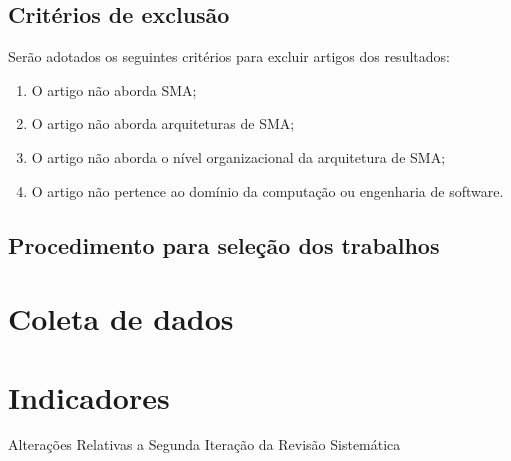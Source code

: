 \subsection{Critérios de exclusão}

Serão adotados os seguintes critérios para excluir artigos dos resultados:

\begin{enumerate}
    \item O artigo não aborda SMA;
    \item O artigo não aborda arquiteturas de SMA;
    \item O artigo não aborda o nível organizacional da arquitetura de SMA;
    \item O artigo não pertence ao domínio da computação ou engenharia de software.
\end{enumerate}

\subsection{Procedimento para seleção dos trabalhos}


\section{Coleta de dados}

\section{Indicadores}






Alterações Relativas a Segunda Iteração da Revisão
Sistemática








